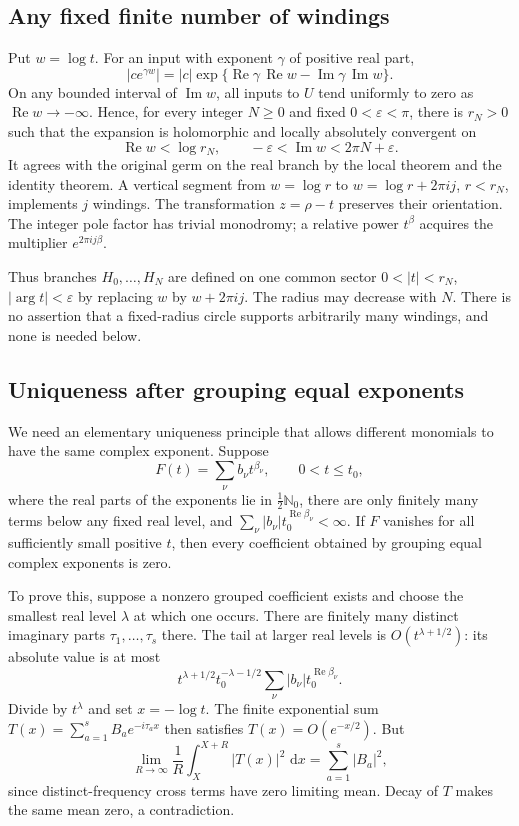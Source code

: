 \documentclass[11pt]{article}
\theoremstyle{remark}\newtheorem{remark}[theorem]{Remark}
\DeclareMathOperator{\Rea}{Re}
\DeclareMathOperator{\Ima}{Im}
\newcommand{\dd}{\,\mathrm d}
\newcommand{\eps}{\varepsilon}
\newcommand{\N}{\mathbb N}
\numberwithin{equation}{section}
\begin{document}
\subsection{Any fixed finite number of windings}
Put $w=\log t$. For an input with exponent $\gamma$ of positive
real part,
\[
|ce^{\gamma w}|=|c|\exp\{\Rea\gamma\,\Rea w
-\Ima\gamma\,\Ima w\}.
\]
On any bounded interval of $\Ima w$, all inputs to $U$ tend
uniformly to zero as $\Rea w\to-\infty$. Hence, for every
integer $N\ge0$ and fixed $0<\eps<\pi$, there is $r_N>0$
such that the expansion is holomorphic and locally absolutely
convergent on
\[
\Rea w<\log r_N,\qquad -\eps<\Ima w<2\pi N+\eps.
\]
It agrees with the original germ on the real branch by the local
theorem and the identity theorem. A vertical segment from
$w=\log r$ to $w=\log r+2\pi i j$, $r<r_N$, implements $j$
windings. The transformation $z=\rho-t$ preserves their orientation.
The integer pole factor has trivial monodromy; a relative power
$t^\beta$ acquires the multiplier $e^{2\pi i j\beta}$.

Thus branches $H_0,\ldots,H_N$ are defined on one common sector
$0<|t|<r_N$, $|\arg t|<\eps$ by replacing $w$ by
$w+2\pi i j$. The radius may decrease with $N$. There is no
assertion that a fixed-radius circle supports arbitrarily many
windings, and none is needed below.

\subsection{Uniqueness after grouping equal exponents}
We need an elementary uniqueness principle that allows different
monomials to have the same complex exponent.
Suppose
\[
F(t)=\sum_\nu b_\nu t^{\beta_\nu},\qquad 0<t\le t_0,
\]
where the real parts of the exponents lie in $\tfrac12\N_0$, there are only
finitely many terms below any fixed real level, and
$\sum_\nu|b_\nu|t_0^{\Rea\beta_\nu}<\infty$.
If $F$ vanishes for all sufficiently small positive $t$, then every
coefficient obtained by grouping equal complex exponents is zero.

To prove this, suppose a nonzero grouped coefficient exists and
choose the smallest real level $\lambda$ at which one occurs.
There are finitely many distinct imaginary parts
$\tau_1,\ldots,\tau_s$ there. The tail at larger real levels is
$O(t^{\lambda+1/2})$: its absolute value is at most
\[
t^{\lambda+1/2}t_0^{-\lambda-1/2}
\sum_\nu |b_\nu|t_0^{\Rea\beta_\nu}.
\]
Divide by $t^\lambda$ and set $x=-\log t$. The finite exponential
sum $T(x)=\sum_{a=1}^s B_ae^{-i\tau_ax}$ then satisfies
$T(x)=O(e^{-x/2})$. But
\[
\lim_{R\to\infty}\frac1R\int_X^{X+R}|T(x)|^2\,\dd x
=\sum_{a=1}^s|B_a|^2,
\]
since distinct-frequency cross terms have zero limiting mean.
Decay of $T$ makes the same mean zero, a contradiction.
\end{document}
